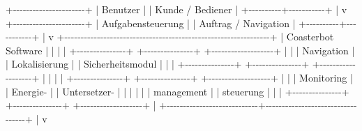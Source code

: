 \documentclass[
]{article}
\newenvironment{Shaded}{}{}
\newcommand{\NormalTok}[1]{#1}
\begin{document}
\begin{Shaded}
\begin{Highlighting}[]
\NormalTok{                         +{-}{-}{-}{-}{-}{-}{-}{-}{-}{-}{-}{-}{-}{-}{-}{-}{-}{-}{-}{-}{-}{-}+}
\NormalTok{                         |       Benutzer       |}
\NormalTok{                         |  Kunde / Bediener    |}
\NormalTok{                         +{-}{-}{-}{-}{-}{-}{-}{-}{-}{-}+{-}{-}{-}{-}{-}{-}{-}{-}{-}{-}{-}+}
\NormalTok{                                    |}
\NormalTok{                                    v}
\NormalTok{                         +{-}{-}{-}{-}{-}{-}{-}{-}{-}{-}{-}{-}{-}{-}{-}{-}{-}{-}{-}{-}{-}{-}+}
\NormalTok{                         |  Aufgabensteuerung   |}
\NormalTok{                         | Auftrag / Navigation |}
\NormalTok{                         +{-}{-}{-}{-}{-}{-}{-}{-}{-}{-}+{-}{-}{-}{-}{-}{-}{-}{-}{-}{-}{-}+}
\NormalTok{                                    |}
\NormalTok{                                    v}
\NormalTok{+{-}{-}{-}{-}{-}{-}{-}{-}{-}{-}{-}{-}{-}{-}{-}{-}{-}{-}{-}{-}{-}{-}{-}{-}{-}{-}{-}{-}{-}{-}{-}{-}{-}{-}{-}{-}{-}{-}{-}{-}{-}{-}{-}{-}{-}{-}{-}{-}{-}{-}{-}{-}{-}{-}{-}{-}{-}{-}{-}{-}{-}{-}{-}+}
\NormalTok{|                    Coasterbot Software                        |}
\NormalTok{|                                                               |}
\NormalTok{| +{-}{-}{-}{-}{-}{-}{-}{-}{-}{-}{-}{-}{-}{-}{-}+  +{-}{-}{-}{-}{-}{-}{-}{-}{-}{-}{-}{-}{-}{-}{-}+  +{-}{-}{-}{-}{-}{-}{-}{-}{-}{-}{-}{-}{-}{-}{-}{-}{-}{-}{-}+ |}
\NormalTok{| | Navigation    |  | Lokalisierung  |  | Sicherheitsmodul  | |}
\NormalTok{| +{-}{-}{-}{-}{-}{-}{-}{-}{-}{-}{-}{-}{-}{-}{-}+  +{-}{-}{-}{-}{-}{-}{-}{-}{-}{-}{-}{-}{-}{-}{-}+  +{-}{-}{-}{-}{-}{-}{-}{-}{-}{-}{-}{-}{-}{-}{-}{-}{-}{-}{-}+ |}
\NormalTok{|                                                               |}
\NormalTok{| +{-}{-}{-}{-}{-}{-}{-}{-}{-}{-}{-}{-}{-}{-}{-}+  +{-}{-}{-}{-}{-}{-}{-}{-}{-}{-}{-}{-}{-}{-}{-}+  +{-}{-}{-}{-}{-}{-}{-}{-}{-}{-}{-}{-}{-}{-}{-}{-}{-}{-}{-}+ |}
\NormalTok{| | Monitoring    |  | Energie{-}      |  | Untersetzer{-}      | |}
\NormalTok{| |               |  | management    |  | steuerung         | |}
\NormalTok{| +{-}{-}{-}{-}{-}{-}{-}{-}{-}{-}{-}{-}{-}{-}{-}+  +{-}{-}{-}{-}{-}{-}{-}{-}{-}{-}{-}{-}{-}{-}{-}+  +{-}{-}{-}{-}{-}{-}{-}{-}{-}{-}{-}{-}{-}{-}{-}{-}{-}{-}{-}+ |}
\NormalTok{+{-}{-}{-}{-}{-}{-}{-}{-}{-}{-}{-}{-}{-}{-}{-}{-}{-}{-}{-}{-}{-}{-}{-}{-}{-}{-}{-}{-}+{-}{-}{-}{-}{-}{-}{-}{-}{-}{-}{-}{-}{-}{-}{-}{-}{-}{-}{-}{-}{-}{-}{-}{-}{-}{-}{-}{-}{-}{-}{-}{-}{-}{-}+}
\NormalTok{                             |}
\NormalTok{                             v}

\end{Highlighting}
\end{Shaded}
\end{document}
